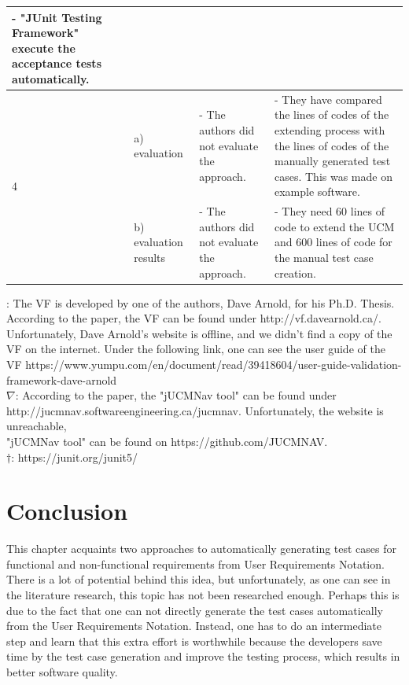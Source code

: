 \begin{landscape}
\begin{table}
\begin{longtable}[h]{|p{1.3cm}|>{\raggedright}p{2.6cm}|>{}p{9.2cm}|>{}p{9.2cm}|}
			- "JUnit Testing Framework" execute the acceptance tests automatically.
			\\
			\cline{2-4}
			\hline %
			\multirow{2}{*}{4 \rotatebox[origin=r]{90}{\textbf{Quality}}} 
			& a) evaluation
			& - The authors did not evaluate the approach. 
			& - They have compared the lines of codes of the extending process with the lines of codes of the manually generated test cases. This was made on example software. 
			\\
			\cline{2-4}
			& b) evaluation results 
			&- The authors did not evaluate the approach. &
			- They need 60 lines of code to extend the UCM and 600 lines of code for the manual test case creation. \\
			\cline{2-4}
			\hline %
		\end{longtable}
		\qquad \qquad *: The VF is developed by one of the authors, Dave Arnold, for his Ph.D. Thesis. According to the paper, the VF can be found under http://vf.davearnold.ca/.\\
		\null \qquad \qquad \quad Unfortunately, Dave Arnold's website is offline, and we didn't find a copy of the VF on the internet. Under the following link, one can see the user guide of the \\
		\null \qquad \qquad \quad VF https://www.yumpu.com/en/document/read/39418604/user-guide-validation-framework-dave-arnold \\
		\null \qquad \qquad $\nabla$: According to the paper, the "jUCMNav tool" can be found under http://jucmnav.softwareengineering.ca/jucmnav. Unfortunately, the website is unreachable, \\
		\null \qquad \qquad \quad "jUCMNav tool" can be found on https://github.com/JUCMNAV.\\
		\null \qquad \qquad $\dagger$: https://junit.org/junit5/
		\label{tab:08_syntheseMatrix2}
	\end{table}
	
\end{landscape}
\restoregeometry
\section{Conclusion}

This chapter acquaints two approaches to automatically generating test cases for functional and non-functional requirements from User Requirements Notation. There is a lot of potential behind this idea, but unfortunately, as one can see in the literature research, this topic has not been researched enough. Perhaps this is due to the fact that one can not directly generate the test cases automatically from the User Requirements Notation. Instead, one has to do an intermediate step and learn that this extra effort is worthwhile because the developers save time by the test case generation and improve the testing process, which results in better software quality. 


